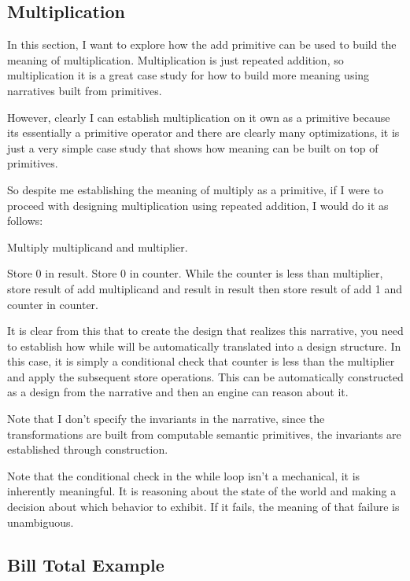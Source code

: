 \subsection{Multiplication}

In this section, I want to explore how the add primitive can be used to build the meaning of multiplication. Multiplication is just repeated addition, so multiplication it is a great case study for how to build more meaning using narratives built from primitives. 

However, clearly I can establish multiplication on it own as a primitive because its essentially a primitive operator and there are clearly many optimizations, it is just a very simple case study that shows how meaning can be built on top of primitives.

So despite me establishing the meaning of multiply as a primitive, if I were to proceed with designing multiplication using repeated addition, I would do it as follows:

\begin{greyquote}
Multiply {multiplicand} and {multiplier}.
\end{greyquote}

\begin{greyquote}
Store 0 in result. Store 0 in counter. While the counter is less than multiplier, store result of add multiplicand and result in result then store result of add 1 and counter in counter.
\end{greyquote}

It is clear from this that to create the design that realizes this narrative, you need to establish how while will be automatically translated into a design structure. In this case, it is simply a conditional check that counter is less than the multiplier and apply the subsequent store operations. This can be automatically constructed as a design from the narrative and then an engine can reason about it. 

Note that I don't specify the invariants in the narrative, since the transformations are built from computable semantic primitives, the invariants are established through construction. 

Note that the conditional check in the while loop isn't a mechanical, it is inherently meaningful. It is reasoning about the state of the world and making a decision about which behavior to exhibit. If it fails, the meaning of that failure is unambiguous.

\subsection{Bill Total Example}

